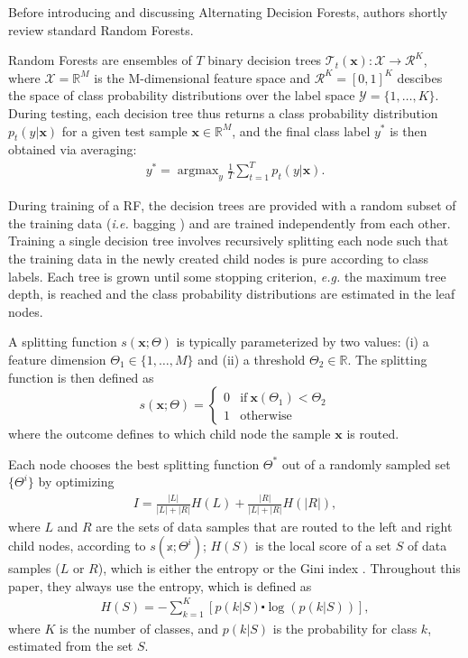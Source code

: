 \documentclass[10pt,twocolumn,letterpaper]{article}
\begin{document}
Before introducing and discussing Alternating Decision Forests, authors shortly review standard Random Forests.

Random Forests \cite{Shape,Consistency} are ensembles of $T$ binary decision trees $\mathcal{T}_t(\mathbf{x}) : \mathcal{X} \to \mathcal{R}^K$, where $\mathcal{X} = \mathbb{R}^M$ is the M-dimensional feature space and $\mathcal{R}^K = [0,1]^K$ descibes the space of class probability distributions over the label space $\mathcal{Y} = \{1,\dots,K\}$. During testing, each decision tree thus returns a class probability distribution $p_t(y|\mathbf{x})$ for a given test sample 
$\mathbf{x} \in \mathbb{R}^M$, and the final class label $y^*$ is then obtained via averaging:\\
\begin{gather*}
y^* = \mathop{\arg\max}_{y} \frac{1}{T}\sum_{t=1}^{T}p_t(y|\mathbf{x}). \tag{1}
\end{gather*}

During training of a RF, the decision trees are provided with a random subset of the training data (\emph{i.e.} bagging \cite{Consistency}) and are trained independently from each other. Training a single decision tree involves recursively splitting each node such that the training data in the newly created child nodes is pure according to class labels. Each tree is grown until some stopping criterion, \emph{e.g.} the maximum tree depth, is reached and the class probability distributions are estimated in the leaf nodes.

A splitting function $s(\mathbf{x};\Theta)$ is typically parameterized by two values: (i) a feature dimension $\Theta_1 \in \{1,\dots,M\}$ and (ii) a threshold $\Theta_2 \in \mathbb{R}$. The splitting function is then defined as\\
\[
s(\mathbf{x};\Theta) = 
\begin{cases}
0 & \text{if}~\mathbf{x}(\Theta_1) < \Theta_2 \\
1 & \text{otherwise}
\tag{2}
\end{cases}
\]
where the outcome defines to which child node the sample $\mathbf{x}$ is routed.

Each node chooses the best splitting function $\Theta^*$ out of a randomly sampled set $\{\Theta^i\}$ by optimizing\\
\begin{gather*}
I = \frac{|L|}{|L| + |R|}H(L) + \frac{|R|}{|L| + |R|}H(|R|),
\tag{3}
\label{eq3}
\end{gather*}
where $L$ and $R$ are the sets of data samples that are routed to the left and right child nodes, according to $s(\mathbb{x};\Theta^i)$; $H(S)$ is the local score of a set $S$ of data samples ($L$ or $R$), which is either the entropy or the Gini index \cite{Consistency}. Throughout this paper, they always use the entropy, which is defined as\\
\begin{gather*}
H(S) = -\sum_{k=1}^K[p(k|S) \centerdot \log(p(k|S))],
\tag{4}
\end{gather*}
where $K$ is the number of classes, and $p(k|S)$ is the probability for class $k$, estimated from the set $S$.
\end{document}
